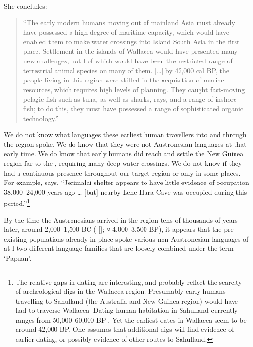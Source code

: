 She concludes:

\begin{quote}
	``The early modern humans moving out of mainland Asia must already have possessed a high degree of maritime
	capacity, which would have enabled them to make water crossings into Island South Asia in the first place.
	Settlement in the islands of Wallacea would have presented many new challenges,
	not l of which would have been the restricted range of terrestrial animal species on many of them.
	[{\ldots}] by 42,000 cal BP,
	the people living in this region were skilled in the acquisition of marine resources,
	which requires high levels of planning.
	They caught fast-moving pelagic fish such as tuna,
	as well as sharks,
	rays, and a range of inshore fish; to do this,
	they must have possessed a range of sophisticated organic technology.''
	\citep[221]{OConnor2015}
\end{quote}

We do not know what languages these earliest human travellers into
and through the region spoke.
We do know that they were not Austronesian languages at that early time.
We do know that early humans did reach
and settle the New Guinea region far to the ,
requiring many deep water crossings.
We do not know if they had a continuous presence throughout our target region or only in some places.
For example, \citet[220]{OConnor2015} says, “Jerimalai shelter appears to have little evidence of occupation
38,000--24,000 years ago {\ldots} [but] nearby Lene Hara Cave was occupied during this period.”\footnote{
		The relative gaps in dating are interesting,
		and probably reflect the scarcity of archeological digs in the Wallacea region.
		Presumably early humans travelling to Sahulland (the Australia
		and New Guinea region) would have had to traverse Wallacea.
		Dating human habitation in Sahulland currently ranges
		from 50,000--60,000 BP \citep{OConnellAllen2003,ReddStoneking1999}.
		Yet the earliest dates in Wallacea seem to be around 42,000 BP.
		One assumes that additional digs will find evidence of earlier dating,
		or possibly evidence of other routes to Sahulland.}

By the time the Austronesians arrived in the region
tens of thousands of years later, around 2,000--1,500
BC (\citeauthor{Bellwood2007} [\citeyear[123]{Bellwood2007}]; ≈ 4,000--3,500 BP),
it appears that the pre-existing populations already in place spoke various non-Austronesian languages
of at l two different language families that are loosely combined under the term ‘Papuan’.


